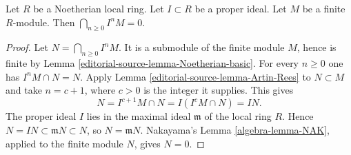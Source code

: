 \begin{lemma}
\label{editorial-source-lemma-intersect-powers-ideal-module-zero}
Let $R$ be a Noetherian local ring. Let $I \subset R$ be
a proper ideal. Let $M$ be a finite $R$-module.
Then $\bigcap_{n \geq 0} I^nM = 0$.
\end{lemma}

\begin{proof}
Let $N=\bigcap_{n\geq0}I^nM$. It is a submodule of the finite
module $M$, hence is finite by Lemma \ref{editorial-source-lemma-Noetherian-basic}.
For every $n\geq0$ one has $I^nM\cap N=N$.
Apply Lemma \ref{editorial-source-lemma-Artin-Rees} to $N\subset M$ and take
$n=c+1$, where $c>0$ is the integer it supplies. This gives
$$
N=I^{c+1}M\cap N=I(I^cM\cap N)=IN.
$$
The proper ideal $I$ lies in the maximal ideal $\mathfrak m$
of the local ring $R$. Hence
$N=IN\subset\mathfrak mN\subset N$, so
$N=\mathfrak mN$. Nakayama's Lemma \ref{algebra-lemma-NAK}, applied
to the finite module $N$, gives $N=0$.
\end{proof}